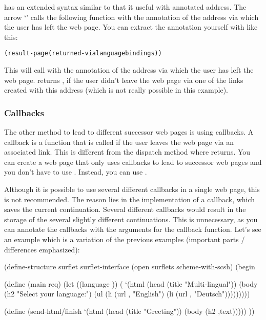  has an extended syntax similar to 
that it useful with annotated address.  The arrow `\name{=>}' calls
the following function with the annotation of the address via which
the user has left the web page.  You can extract the annotation
yourself with  like this:

\begin{alltt}
(result-page (returned-via language bindings))	
\end{alltt}

This will call  with the annotation of the address
via which the user has left the web page.   returns
\sharpf, if the user didn't leave the web page via one of the links
created with this address (which is not really possible in this
example).

\subsubsection{Callbacks}

The other method to lead to different successor web pages is using
callbacks.  A callback is a function that is called if the user leaves
the web page via an associated link.  This is different from the
dispatch method where  returns.  You can
create a web page that only uses callbacks to lead to successor web
pages and you don't have to use .
Instead, you can use .

Although it is possible to use several different callbacks in a single
web page, this is not recommended.  The reason lies in the
implementation of a callback, which saves the current continuation.
Several different callbacks would result in the storage of the several
slightly different continuations.  This is unnecessary, as you can
annotate the callbacks with the arguments for the callback function.
Let's see an example which is a variation of the previous examples
(important parts / differences emphasized):

\begin{listing}
(define-structure surflet surflet-interface
  (open surflets
        scheme-with-scsh)
  (begin
    
    (define (main req)
      (let ((language ))
        (
         `(html 
           (head (title "Multi-lingual"))
           (body 
            (h2 "Select your language:")
            (ul
             (li (url ,
                      "English")
                 (li (url ,
                          "Deutsch")))))))))

    (define 
      (send-html/finish
       `(html 
         (head (title "Greeting"))
         (body
          (h2 ,text)))))
    ))
\end{listing}

